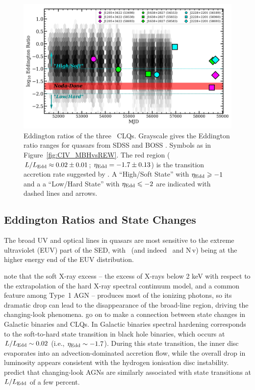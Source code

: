 \documentclass[fleqn,usenatbib]{mnras}
\begin{document}
\begin{figure}
  \centering
  \includegraphics[width=14.5cm, trim=0.2cm 0.2cm 0.0cm 0.2cm, clip]
  {figures/MJD_vs_Eddington_20191211}
  \vspace{-12pt}
  \caption[]{Eddington ratios of the three \civ\ CLQs.  Grayscale gives the
    Eddington ratio ranges for quasars from SDSS \citet[][]{Shen2011} and
    BOSS \citep[][]{Kozlowski2017}.  Symbols as in
    Figure~\ref{fig:CIV_MBHvsREW}.  The red region ($L / L_{\rm Edd}
    \approx 0.02 \pm 0.01$; $\eta_{\rm Edd} = -1.7 \pm 0.13$) is the
    transition accretion rate suggested by \citet{NodaDone2018}.  A
    ``High/Soft State'' with $\eta_{\rm Edd} \geq -1$ and a a ``Low/Hard
    State'' with $\eta_{\rm Edd} \leq -2$ are indicated with dashed lines
    and arrows.}
  \label{fig:Eddington_ratios}
\end{figure}

\subsection{Eddington Ratios and State Changes} 
The broad UV and optical lines in quasars are most sensitive to the
extreme ultraviolet (EUV) part of the SED, with \civ\ (and indeed 
\heii\ and N\,{\sc v}) being at the higher energy end of the EUV
distribution.

\citet{NodaDone2018} note that the soft X-ray excess -- the excess of
X-rays below 2 keV with respect to the extrapolation of the hard X-ray
spectral continuum model, and a common feature among Type~1 AGN --
produces most of the ionizing photons, so its dramatic drop can lead
to the disappearance of the broad-line region, driving the
changing-look phenomena. \citet{NodaDone2018} go on to make a
connection between state changes in Galactic binaries and CLQs.  In
Galactic binaries spectral hardening corresponds to the soft-to-hard
state transition in black hole binaries, which occurs at $L / L_{\rm
Edd} \sim 0.02$ (i.e., $\eta_{\rm Edd} \sim -1.7$).  During this state
transition, the inner disc evaporates into an advection-dominated
accretion flow, while the overall drop in luminosity appears
consistent with the hydrogen ionisation disc instability.
\citet{NodaDone2018} predict that changing-look AGNs are similarly
associated with state transitions at $L / L_{\rm Edd}$ of a few
percent.
\end{document}

